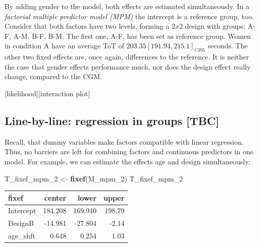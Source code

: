\documentclass[]{svmono}
\newenvironment{Shaded}{\begin{snugshade}}{\end{snugshade}}
\newcommand{\KeywordTok}[1]{\textcolor[rgb]{0.13,0.29,0.53}{\textbf{#1}}}
\newcommand{\DataTypeTok}[1]{\textcolor[rgb]{0.13,0.29,0.53}{#1}}
\newcommand{\DecValTok}[1]{\textcolor[rgb]{0.00,0.00,0.81}{#1}}
\newcommand{\StringTok}[1]{\textcolor[rgb]{0.31,0.60,0.02}{#1}}
\newcommand{\OperatorTok}[1]{\textcolor[rgb]{0.81,0.36,0.00}{\textbf{#1}}}
\newcommand{\NormalTok}[1]{#1}
\begin{document}
By adding gender to the model, both effects are estimated
simultaneously. In a \emph{factorial multiple predictor model (MPM)} the
intercept is a reference group, too. Consider that both factors have two
levels, forming a \(2x 2\) design with groups: A-F, A-M, B-F, B-M. The
first one, A-F, has been set as reference group. Women in condition A
have an average ToT of \(203.35 [191.94, 215.1]_{CI95}\) seconds. The
other two fixed effects are, once again, differences to the reference.
It is neither the case that gender effects performance much, nor does
the design effect really change, compared to the CGM.

{[}likelihood{]}{[}interaction plot{]}

\subsection{Line-by-line: regression in groups
{[}TBC{]}}\label{line-by-line}

Recall, that dummy variables make factors compatible with linear
regression. Thus, no barriers are left for combining factors and
continuous predictors in one model. For example, we can estimate the
effects age and design simultaneously:

\begin{Shaded}
\end{Shaded}

\begin{Shaded}
\begin{Highlighting}[]
\NormalTok{T_fixef_mpm_}\DecValTok{2}\NormalTok{ <-}\StringTok{  }\KeywordTok{fixef}\NormalTok{(M_mpm_}\DecValTok{2}\NormalTok{)}
\NormalTok{T_fixef_mpm_}\DecValTok{2}
\end{Highlighting}
\end{Shaded}

\begin{longtable}[]{@{}lrrr@{}}
\toprule
fixef & center & lower & upper\tabularnewline
\midrule
\endhead
Intercept & 184.208 & 169.940 & 198.79\tabularnewline
DesignB & -14.981 & -27.804 & -2.14\tabularnewline
age\_shft & 0.648 & 0.254 & 1.03\tabularnewline
\bottomrule
\end{longtable}
\end{document}
